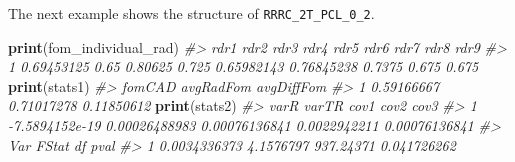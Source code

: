 \documentclass[
]{book}
\newenvironment{Shaded}{\begin{snugshade}}{\end{snugshade}}
\newcommand{\CommentTok}[1]{\textcolor[rgb]{0.56,0.35,0.01}{\textit{#1}}}
\newcommand{\DataTypeTok}[1]{\textcolor[rgb]{0.13,0.29,0.53}{#1}}
\newcommand{\DecValTok}[1]{\textcolor[rgb]{0.00,0.00,0.81}{#1}}
\newcommand{\KeywordTok}[1]{\textcolor[rgb]{0.13,0.29,0.53}{\textbf{#1}}}
\newcommand{\NormalTok}[1]{#1}
\newcommand{\OperatorTok}[1]{\textcolor[rgb]{0.81,0.36,0.00}{\textbf{#1}}}
\newcommand{\StringTok}[1]{\textcolor[rgb]{0.31,0.60,0.02}{#1}}
\begin{document}
The next example shows the structure of \texttt{RRRC\_2T\_PCL\_0\_2}.

\begin{Shaded}
\end{Shaded}

\begin{Shaded}
\begin{Highlighting}[]

\KeywordTok{print}\NormalTok{(fom_individual_rad)}
\CommentTok{#>         rdr1 rdr2    rdr3  rdr4       rdr5       rdr6   rdr7  rdr8  rdr9}
\CommentTok{#> 1 0.69453125 0.65 0.80625 0.725 0.65982143 0.76845238 0.7375 0.675 0.675}
\KeywordTok{print}\NormalTok{(stats1)}
\CommentTok{#>       fomCAD  avgRadFom avgDiffFom}
\CommentTok{#> 1 0.59166667 0.71017278 0.11850612}
\KeywordTok{print}\NormalTok{(stats2)}
\CommentTok{#>             varR         varTR          cov1         cov2          cov3}
\CommentTok{#> 1 -7.5894152e-19 0.00026488983 0.00076136841 0.0022942211 0.00076136841}
\CommentTok{#>            Var     FStat        df        pval}
\CommentTok{#> 1 0.0034336373 4.1576797 937.24371 0.041726262}
\end{Highlighting}
\end{Shaded}
\end{document}
